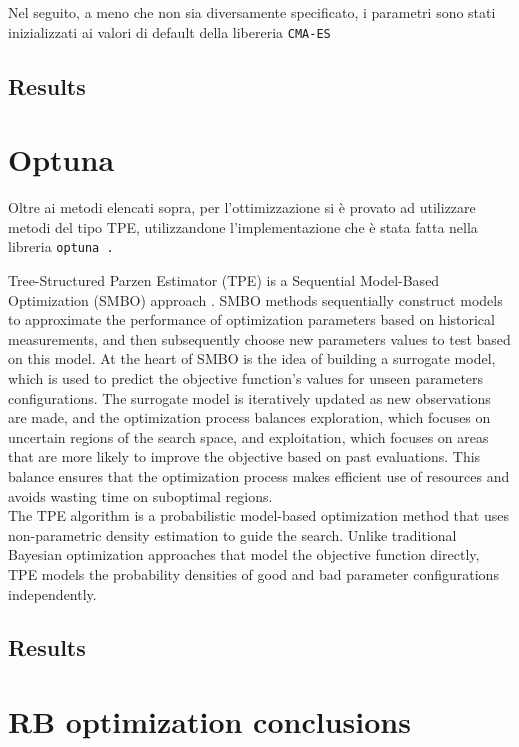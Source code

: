 Nel seguito, a meno che non sia diversamente specificato, i parametri sono stati inizializzati ai valori di default della libereria \tt{CMA-ES}
\subsection{Results}


\section{Optuna}
Oltre ai metodi elencati sopra, per l'ottimizzazione si è provato ad utilizzare metodi del tipo TPE, utilizzandone l'implementazione che è stata fatta nella libreria \tt{optuna} \cite{optuna_2019}.

Tree-Structured Parzen Estimator (TPE) is a Sequential Model-Based Optimization (SMBO) approach \cite{SMBO_proceedings}. 
SMBO methods sequentially construct models to approximate the performance of optimization parameters based on historical measurements, and then subsequently choose new parameters values to test based on this model. \cite{BayesianOptimizationReview}
At the heart of SMBO is the idea of building a surrogate model, which is used to predict the objective function's values for unseen parameters configurations. 
The surrogate model is iteratively updated as new observations are made, and the optimization process balances exploration, which focuses on uncertain regions of the search space, and exploitation, which focuses on areas that are more likely to improve the objective based on past evaluations. 
This balance ensures that the optimization process makes efficient use of resources and avoids wasting time on suboptimal regions.\\

The TPE algorithm is a probabilistic model-based optimization method that uses non-parametric density estimation to guide the search. 
Unlike traditional Bayesian optimization approaches that model the objective function directly, TPE models the probability densities of good and bad parameter configurations independently.\\
\subsection{Results}

\section{RB optimization conclusions}